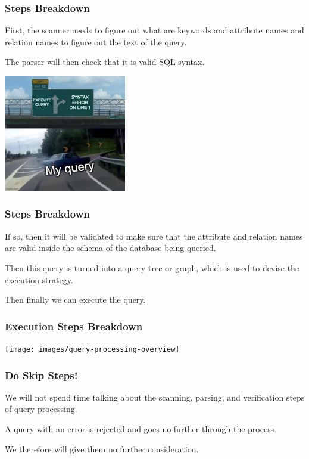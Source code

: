 \begin{frame}
\frametitle{Steps Breakdown}
First, the scanner needs to figure out what are keywords and attribute names and relation names to figure out the text of the query. 

The parser will then check that it is valid SQL syntax. 

\begin{center}
	\includegraphics[width=0.4\textwidth]{images/syntaxerror.jpg}
\end{center}

\end{frame}

\begin{frame}
\frametitle{Steps Breakdown}
If so, then it will be validated to make sure that the attribute and relation names are valid inside the schema of the database being queried. 

Then this query is turned into a query tree or graph, which is used to devise the execution strategy. 

Then finally we can execute the query.

\end{frame}

\begin{frame}
\frametitle{Execution Steps Breakdown}
\begin{center}
	\texttt{[image: images/query-processing-overview]}
\end{center}

\end{frame}


\begin{frame}
\frametitle{Do Skip Steps!}

We will not spend time talking about the scanning, parsing, and verification steps of query processing.

A query with an error is rejected and  goes no further through the process. 

We therefore will give them no further consideration.

\end{frame}

